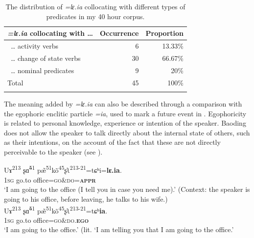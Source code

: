\documentclass[output=paper,colorlinks,citecolor=brown, language=chinese]{langscibook}
\begin{document}
\begin{table}

%
\begin{tabularx}{\textwidth}{Q rr}
\lsptoprule
\textit{=lɛ.ia} collocating with \ldots& Occurrence & Proportion \\
\midrule
~… activity verbs        & 6        & 13.33\% \\
~… change of state verbs & 30       & 66.67\% \\
~… nominal predicates    & 9        & 20\%    \\
\midrule
Total                 & 45       & 100\%   \\
\lspbottomrule
\end{tabularx}

%
\caption{The distribution of \textit{=lɛ.ia} collocating with different types of predicates in my 40 hour corpus.}
\label{tab:song:3}
\end{table}

The meaning added by \textit{=lɛ.ia} can also be described through a comparison with the egophoric enclitic particle \textit{=ia}, used to mark a future event in . Egophoricity is related to personal knowledge, experience or intention of the speaker. Baoding does not allow the speaker to talk directly about the internal state of others, such as their intentions, on the account of the fact that these are not directly perceivable to the speaker (see \cite{Song2019}).


\ea \label{ex:Song23}
\ea \label{ex:Song23a}
\gll Uɤ\textsuperscript{213} ʂ\~ɑ\textsuperscript{51} p\~æ\textsuperscript{51}k\~o\textsuperscript{45}ʂʅ\textsuperscript{213-21}=tɕʰi=\textbf{lɛ.ia}. \\
\textsc{1sg} go.to office=\textsc{go\&do=\textbf{appr}} \\
\glt `I am going to the office (I tell you in case you need me).' (Context: the speaker is going to his office, before leaving, he talks to his wife.) \\
\ex \label{ex:Song23b}
\gll Uɤ\textsuperscript{213} ʂ\~ɑ\textsuperscript{51} p\~æ\textsuperscript{51}k\~o\textsuperscript{45}ʂʅ\textsuperscript{213-21}=tɕʰ\textbf{ia}. \\
\textsc{1sg} go.to office=\textsc{go\&do.\textbf{ego}} \\
\glt `I am going to the office.' (lit. `I am telling you that I am going to the office.'
\z
\z
\end{document}
